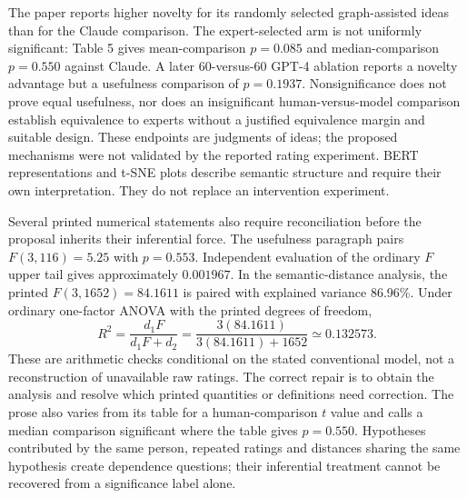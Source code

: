 The paper reports higher novelty for its randomly selected graph-assisted ideas than for the Claude comparison. The expert-selected arm is not uniformly significant: Table 5 gives mean-comparison $p=0.085$ and median-comparison $p=0.550$ against Claude. A later 60-versus-60 GPT-4 ablation reports a novelty advantage but a usefulness comparison of $p=0.1937$. Nonsignificance does not prove equal usefulness, nor does an insignificant human-versus-model comparison establish equivalence to experts without a justified equivalence margin and suitable design. These endpoints are judgments of ideas; the proposed mechanisms were not validated by the reported rating experiment. BERT representations and t-SNE plots describe semantic structure and require their own interpretation. They do not replace an intervention experiment.~\citep{exec20_hypothesis_generation}

Several printed numerical statements also require reconciliation before the proposal inherits their inferential force. The usefulness paragraph pairs $F(3,116)=5.25$ with $p=0.553$. Independent evaluation of the ordinary $F$ upper tail gives approximately $0.001967$. In the semantic-distance analysis, the printed $F(3,1652)=84.1611$ is paired with explained variance 86.96\%. Under ordinary one-factor ANOVA with the printed degrees of freedom,
\begin{equation}
 R^2=\frac{d_1F}{d_1F+d_2}
     =\frac{3(84.1611)}{3(84.1611)+1652}
     \simeq 0.132573.
 \label{exec20:hypothesis-anova}
\end{equation}
These are arithmetic checks conditional on the stated conventional model, not a reconstruction of unavailable raw ratings. The correct repair is to obtain the analysis and resolve which printed quantities or definitions need correction. The prose also varies from its table for a human-comparison $t$ value and calls a median comparison significant where the table gives $p=0.550$. Hypotheses contributed by the same person, repeated ratings and distances sharing the same hypothesis create dependence questions; their inferential treatment cannot be recovered from a significance label alone.~\citep{exec20_hypothesis_generation,exec20_hypothesis_reference}

